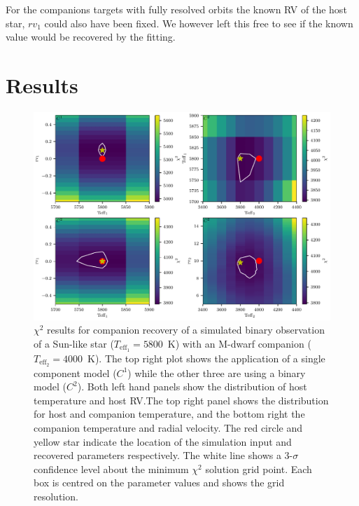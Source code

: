\documentclass[fleqn,usenatbib]{mnras}
\begin{document}
For the companions targets with fully resolved orbits the known RV of the host star, \({rv}_1\) could also have been fixed. We however left this free to see if the known value would be recovered by the fitting.


\section{Results}
\label{sec:results}



\begin{figure}
    \centering
    \includegraphics[width=0.8\hsize]{images/fig3.pdf}

    \caption{\(\chi^2\) results for companion recovery of a simulated binary observation of a Sun-like star (\(T_{\textrm{eff}_1}=5800\)~K) with an M-dwarf companion (\(T_{\textrm{eff}_2}=4000\)~K). The top right plot shows the application of a single component model (\(C^1\)) while the other three are using a binary model (\(C^2\)). Both left hand panels show the distribution of host temperature and host RV.\@ The top right panel shows the distribution for host and companion temperature, and the bottom right the companion temperature and radial velocity.
        The red circle and yellow star indicate the location of the simulation input and recovered parameters respectively.
        The white line shows a 3-\(\sigma\) confidence level about the minimum \(\chi^2\) solution grid point. Each box is centred on the parameter values and shows the grid resolution.}
    \label{fig:Mdwarf_contours}
\end{figure}
\end{document}

